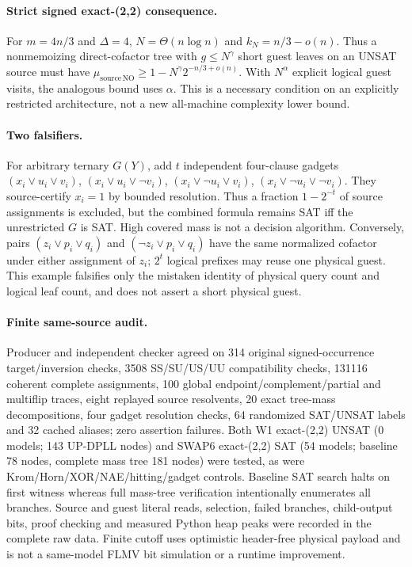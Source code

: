 \documentclass[11pt]{article}
\begin{document}
\paragraph{Strict signed exact-(2,2) consequence.}
For $m=4n/3$ and $\Delta=4$, $N=\Theta(n\log n)$ and $k_N=n/3-o(n)$. Thus a nonmemoizing direct-cofactor tree with $g\le N^\gamma$ short guest leaves on an UNSAT source must have $\mu_{\mathrm{source\,NO}}\ge1-N^\gamma2^{-n/3+o(n)}$. With $N^\alpha$ explicit logical guest visits, the analogous bound uses $\alpha$. This is a necessary condition on an explicitly restricted architecture, not a new all-machine complexity lower bound.

\paragraph{Two falsifiers.}
For arbitrary ternary $G(Y)$, add $t$ independent four-clause gadgets
$(x_i\vee u_i\vee v_i)$,
$(x_i\vee u_i\vee\neg v_i)$,
$(x_i\vee\neg u_i\vee v_i)$,
$(x_i\vee\neg u_i\vee\neg v_i)$.
They source-certify $x_i=1$ by bounded resolution. Thus a fraction $1-2^{-t}$ of source assignments is excluded, but the combined formula remains SAT iff the unrestricted $G$ is SAT. High covered mass is not a decision algorithm. Conversely, pairs $(z_i\vee p_i\vee q_i)$ and $(\neg z_i\vee p_i\vee q_i)$ have the same normalized cofactor under either assignment of $z_i$; $2^t$ logical prefixes may reuse one physical guest. This example falsifies only the mistaken identity of physical query count and logical leaf count, and does not assert a short physical guest.

\paragraph{Finite same-source audit.}
Producer and independent checker agreed on 314 original signed-occurrence target/inversion checks, 3508 SS/SU/US/UU compatibility checks, 131116 coherent complete assignments, 100 global endpoint/complement/partial and multiflip traces, eight replayed source resolvents, 20 exact tree-mass decompositions, four gadget resolution checks, 64 randomized SAT/UNSAT labels and 32 cached aliases; zero assertion failures. Both W1 exact-(2,2) UNSAT (0 models; 143 UP-DPLL nodes) and SWAP6 exact-(2,2) SAT (54 models; baseline 78 nodes, complete mass tree 181 nodes) were tested, as were Krom/Horn/XOR/NAE/hitting/gadget controls. Baseline SAT search halts on first witness whereas full mass-tree verification intentionally enumerates all branches. Source and guest literal reads, selection, failed branches, child-output bits, proof checking and measured Python heap peaks were recorded in the complete raw data. Finite cutoff uses optimistic header-free physical payload and is not a same-model FLMV bit simulation or a runtime improvement.
\end{document}
